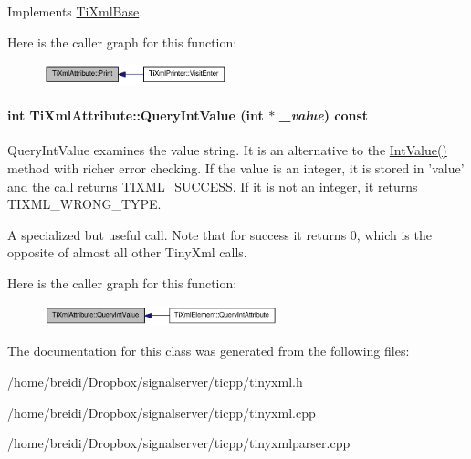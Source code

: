 Implements \hyperlink{class_ti_xml_base_a0de56b3f2ef14c65091a3b916437b512}{TiXmlBase}.

Here is the caller graph for this function:\nopagebreak
\begin{figure}[H]
\begin{center}
\leavevmode
\includegraphics[width=151pt]{class_ti_xml_attribute_acc04956c1d5c4c31fe74f7a7528d109a_icgraph}
\end{center}
\end{figure}
\hypertarget{class_ti_xml_attribute_ad6c93088ee21af41a107931223339344}{
\paragraph[{QueryIntValue}]{\setlength{\rightskip}{0pt plus 5cm}int TiXmlAttribute::QueryIntValue (int $\ast$ {\em \_\-value}) const}\hfill}
\label{class_ti_xml_attribute_ad6c93088ee21af41a107931223339344}
QueryIntValue examines the value string. It is an alternative to the \hyperlink{class_ti_xml_attribute_aa1a20ad59dc7e89a0ab265396360d50f}{IntValue()} method with richer error checking. If the value is an integer, it is stored in 'value' and the call returns TIXML\_\-SUCCESS. If it is not an integer, it returns TIXML\_\-WRONG\_\-TYPE.

A specialized but useful call. Note that for success it returns 0, which is the opposite of almost all other TinyXml calls. 

Here is the caller graph for this function:\nopagebreak
\begin{figure}[H]
\begin{center}
\leavevmode
\includegraphics[width=192pt]{class_ti_xml_attribute_ad6c93088ee21af41a107931223339344_icgraph}
\end{center}
\end{figure}


The documentation for this class was generated from the following files:\begin{DoxyCompactItemize}
\item 
/home/breidi/Dropbox/signalserver/ticpp/tinyxml.h\item 
/home/breidi/Dropbox/signalserver/ticpp/tinyxml.cpp\item 
/home/breidi/Dropbox/signalserver/ticpp/tinyxmlparser.cpp\end{DoxyCompactItemize}
